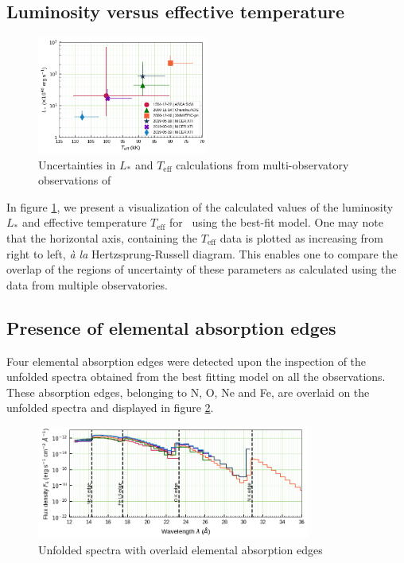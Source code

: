     \subsection{Luminosity versus effective temperature}
    \begin{figure}[!thb]
    	\centering
    	\includegraphics[width=0.5\textwidth]{figures/L-Teff_all-obs.png}
    	\caption{Uncertainties in $L_*$ and $T_\text{eff}$ calculations from multi-observatory observations of \source}
    	\label{fig:L-Teff}
    \end{figure}
    In figure \ref{fig:L-Teff}, we present a visualization of the calculated values of the luminosity $L_*$ and effective temperature $T_\text{eff}$ for \source\ using the best-fit model. One may note that the horizontal axis, containing the $T_\text{eff}$ data is plotted as increasing from right to left, \textit{\`{a} la} Hertzsprung-Russell diagram. This enables one to compare the overlap of the regions of uncertainty of these parameters as calculated using the data from multiple observatories.

    \subsection{Presence of elemental absorption edges}
    Four elemental absorption edges were detected upon the inspection of the unfolded spectra obtained from the best fitting model on all the observations. These absorption edges, belonging to N, O, Ne and Fe, are overlaid on the unfolded spectra and displayed in figure \ref{fig:all-uf:abs-edges}.
    \begin{figure}[!htb]
        \centering
        \includegraphics[width=0.8\textwidth]{figures/eufspec/mr-vel-uf-ang_abs-edge.png}
        \caption{Unfolded spectra with overlaid elemental absorption edges}
        \label{fig:all-uf:abs-edges}
    \end{figure}
    

